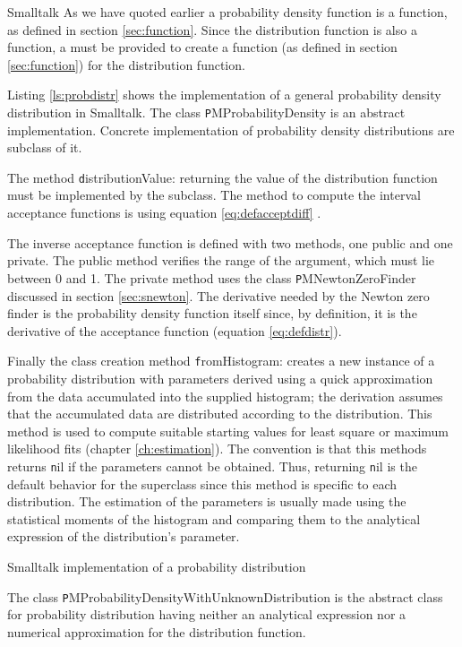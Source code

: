 \begin{displaycode}{Smalltalk}
As we have quoted earlier a probability density function is a
function, as defined in section \ref{sec:function}. Since the
distribution function is also a function, a 
must be provided to create a function (as defined in section
\ref{sec:function}) for the distribution function.

Listing \ref{ls:probdistr} shows the implementation of a general
probability density distribution in Smalltalk. The class {\texttt
PMProbabilityDensity} is an abstract implementation. Concrete
implementation of probability density distributions are subclass
of it.

The method {\texttt distributionValue:} returning the value of the
distribution function must be implemented by the subclass. The
method to compute the interval acceptance functions is using
equation \ref{eq:defacceptdiff} .

The inverse acceptance function is defined with two methods, one
public and one private. The public method verifies the range of
the argument, which must lie between 0 and 1. The private method
uses the class {\texttt PMNewtonZeroFinder} discussed in section
\ref{sec:snewton}. The derivative needed by the Newton zero finder
is the probability density function itself since, by definition,
it is the derivative of the acceptance function (\cf equation
\ref{eq:defdistr}).

Finally the class creation method {\texttt fromHistogram:} creates a
new instance of a probability distribution with parameters derived
using a quick approximation from the data accumulated into the
supplied histogram; the derivation assumes that the accumulated
data are distributed according to the distribution. This method is
used to compute suitable starting values for least square or
maximum likelihood fits (\cf chapter \ref{ch:estimation}). The
convention is that this methods returns {\texttt nil} if the
parameters cannot be obtained. Thus, returning {\texttt nil} is the
default behavior for the superclass since this method is specific
to each distribution. The estimation of the parameters is usually
made using the statistical moments of the histogram and comparing
them to the analytical expression of the distribution's parameter.

\begin{listing} Smalltalk implementation of a probability distribution
\label{ls:probdistr}
%
\end{listing}

The class {\texttt PMProbabilityDensityWithUnknownDistribution} is
the abstract class for probability distribution having neither an
analytical expression nor a numerical approximation for the
distribution function.


\end{displaycode}
